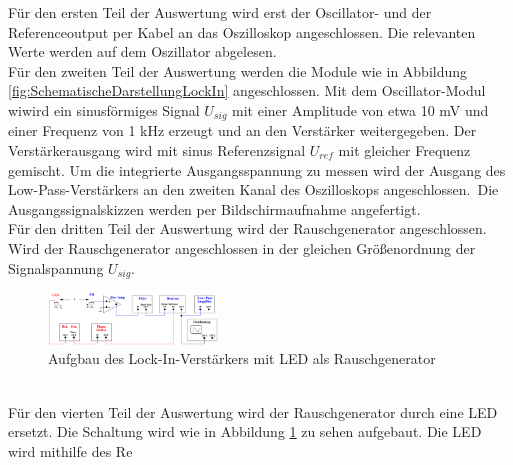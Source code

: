 Für den ersten Teil der Auswertung wird erst der Oscillator- und der Referenceoutput per Kabel an das Oszilloskop angeschlossen. 
Die relevanten Werte werden auf dem Oszillator abgelesen.\\
Für den zweiten Teil der Auswertung werden die Module wie in Abbildung \ref{fig:SchematischeDarstellungLockIn} angeschlossen.
Mit dem Oscillator-Modul wiwird ein sinusförmiges Signal $U_{sig}$ mit einer Amplitude von etwa 10 mV und einer Frequenz von 1 kHz erzeugt
und an den Verstärker weitergegeben. Der Verstärkerausgang wird mit sinus Referenzsignal $U_{ref}$ mit gleicher Frequenz gemischt.
Um die integrierte Ausgangsspannung zu messen wird der Ausgang des Low-Pass-Verstärkers an den zweiten Kanal des Oszilloskops angeschlossen.\
Die Ausgangssignalskizzen werden per Bildschirmaufnahme angefertigt.\\
Für den dritten Teil der Auswertung wird der Rauschgenerator angeschlossen. Wird der Rauschgenerator angeschlossen in der gleichen Größenordnung
der Signalspannung $U_{sig}$.\\
\begin{figure}
    \centering
    \includegraphics[width=0.4\textwidth]{img/LED.png}
    \caption{Aufgbau des Lock-In-Verstärkers mit LED als Rauschgenerator}
    \label{fig:LED}
\end{figure}
\\
Für den vierten Teil der Auswertung wird der Rauschgenerator durch eine LED ersetzt. Die Schaltung wird wie in Abbildung \ref{fig:LED} zu sehen aufgebaut.
Die LED wird mithilfe des Re